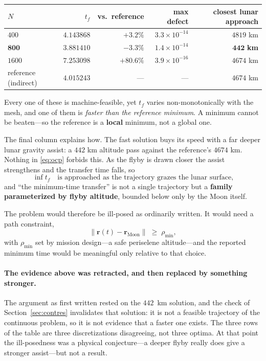 \documentclass[11pt]{article}
\newcommand{\vecr}{\mathbf{r}}
\begin{document}
\begin{table}[h]
\centering\small
\begin{tabular}{lrrrr}
\toprule
$N$ & $t_f$ & vs.\ reference & max defect & closest lunar approach \\
\midrule
$400$  & $4.143868$ & $+3.2\%$  & $3.3\times10^{-14}$ & $4819$ km \\
$\mathbf{800}$  & $\mathbf{3.881410}$ & $\mathbf{-3.3\%}$ & $1.4\times10^{-14}$ & $\mathbf{442}$ \textbf{km} \\
$1600$ & $7.253098$ & $+80.6\%$ & $3.9\times10^{-16}$ & $4674$ km \\
\midrule
reference (indirect) & $4.015243$ & --- & --- & $4674$ km \\
\bottomrule
\end{tabular}
\end{table}

Every one of these is machine-feasible, yet $t_f$ varies non-monotonically with
the mesh, and one of them is \emph{faster than the reference minimum}. A
minimum cannot be beaten---so the reference is a \textbf{local} minimum, not a
global one.

The final column explains how. The fast solution buys its speed with a far
deeper lunar gravity assist: a $442$ km altitude pass against the reference's
$4674$ km. Nothing in \eqref{eq:ocp} forbids this. As the flyby is drawn closer
the assist strengthens and the transfer time falls, so
\[
  \inf t_f \quad\text{is approached as the trajectory grazes the lunar surface,}
\]
and ``the minimum-time transfer'' is not a single trajectory but a
\textbf{family parameterized by flyby altitude}, bounded below only by the Moon
itself.

The problem would therefore be ill-posed as ordinarily written. It would need a
path constraint,
\[
  \lVert \vecr(t) - \vecr_{\text{Moon}} \rVert \;\ge\; \rho_{\min},
\]
with $\rho_{\min}$ set by mission design---a safe periselene altitude---and the
reported minimum time would be meaningful only relative to that choice.

\paragraph{The evidence above was retracted, and then replaced by something
stronger.} The argument as first written rested on the $442$~km solution, and
the check of Section~\ref{sec:contres} invalidates that solution: it is not a
feasible trajectory of the continuous problem, so it is not evidence that a
faster one exists. The three rows of the table are three discretizations
disagreeing, not three optima. At that point the ill-posedness was a physical
conjecture---a deeper flyby really does give a stronger assist---but not a
result.
\end{document}
